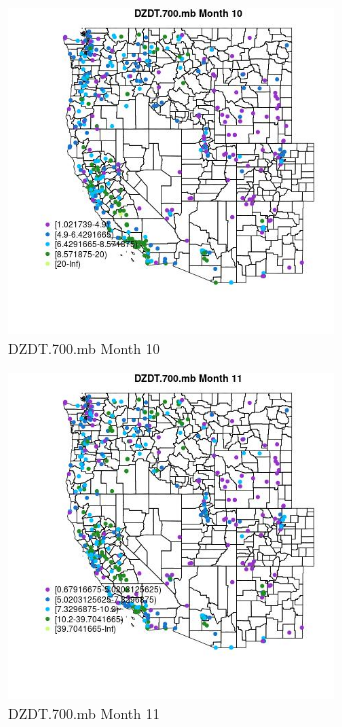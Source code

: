 \begin{figure} 
\centering  
\includegraphics[width=0.77\textwidth]{Code_Outputs/ML_input_report_ML_input_PM25_Step5_part_d_de_duplicated_aves_ML_input_MapObsMo10DZDT700mb.jpg} 
\caption{\label{fig:ML_input_report_ML_input_PM25_Step5_part_d_de_duplicated_aves_ML_inputMapObsMo10DZDT700mb}DZDT.700.mb Month 10} 
\end{figure} 
 

\begin{figure} 
\centering  
\includegraphics[width=0.77\textwidth]{Code_Outputs/ML_input_report_ML_input_PM25_Step5_part_d_de_duplicated_aves_ML_input_MapObsMo11DZDT700mb.jpg} 
\caption{\label{fig:ML_input_report_ML_input_PM25_Step5_part_d_de_duplicated_aves_ML_inputMapObsMo11DZDT700mb}DZDT.700.mb Month 11} 
\end{figure} 
 

